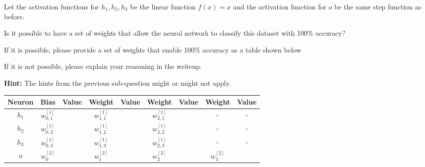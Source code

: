 \item {} Let the activation functions for $h_1, h_2, h_3$ be the linear function $f(x) = x$ and the activation function for $o$ be the same step function as before.


Is it possible to have a set of weights that allow the neural network to classify this dataset with 100\% accuracy?

If it is possible, please provide a set of weights that enable 100\% accuracy as a table shown below

If it is not possible, please explain your reasoning in the writeup.

\textbf{Hint:} The hints from the previous sub-question might or might not apply.

\begin{table}[h]
\centering
\begin{tabular}{ |c||c|c||c|c||c|c||c|c|}
\hline
Neuron & Bias & Value &  Weight & Value & Weight & Value & Weight & Value\\
\hline
$h_1$ & $w_{0,1}^{[1]}$ &  & $w_{1,1}^{[1]}$ &  & $w_{2,1}^{[1]}$ &   & - & -\\
\hline
$h_2$ & $w_{0,2}^{[1]}$ &  & $w_{1,2}^{[1]}$ &  & $w_{2,2}^{[1]}$ &   & - & -\\
\hline
$h_3$ & $w_{0,3}^{[1]}$ &  & $w_{1,3}^{[1]}$ &  & $w_{2,3}^{[1]}$ &   & - & - \\
\hline
$o$ & $w_{0}^{[2]}$ &  & $w_{1}^{[2]}$ &  & $w_{2}^{[2]}$ &  & $w_{3}^{[2]}$ &  \\
\hline
\end{tabular}
\end{table}